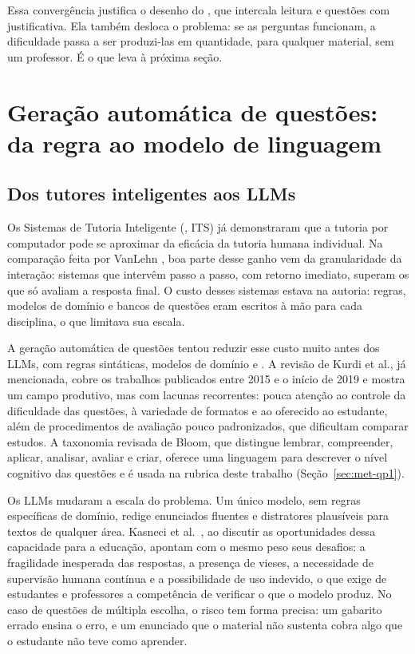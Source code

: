 Essa convergência justifica o desenho do \ferramenta, que intercala leitura e questões com justificativa. Ela também desloca o problema: se as perguntas funcionam, a dificuldade passa a ser produzi-las em quantidade, para qualquer material, sem um professor. É o que leva à próxima seção.

\section{\label{sec:geracao}Geração automática de questões: da regra ao modelo de linguagem}

\subsection{Dos tutores inteligentes aos LLMs}

Os Sistemas de Tutoria Inteligente (, ITS) já demonstraram que a tutoria por computador pode se aproximar da eficácia da tutoria humana individual. Na comparação feita por VanLehn \cite{Van11}, boa parte desse ganho vem da granularidade da interação: sistemas que intervêm passo a passo, com retorno imediato, superam os que só avaliam a resposta final. O custo desses sistemas estava na autoria: regras, modelos de domínio e bancos de questões eram escritos à mão para cada disciplina, o que limitava sua escala.

A geração automática de questões tentou reduzir esse custo muito antes dos LLMs, com regras sintáticas, modelos de domínio e . A revisão de Kurdi et al., já mencionada, cobre os trabalhos publicados entre 2015 e o início de 2019 e mostra um campo produtivo, mas com lacunas recorrentes: pouca atenção ao controle da dificuldade das questões, à variedade de formatos e ao  oferecido ao estudante, além de procedimentos de avaliação pouco padronizados, que dificultam comparar estudos. A taxonomia revisada de Bloom, que distingue lembrar, compreender, aplicar, analisar, avaliar e criar, oferece uma linguagem para descrever o nível cognitivo das questões e é usada na rubrica deste trabalho (Seção~\ref{sec:met-qp1}).

Os LLMs mudaram a escala do problema. Um único modelo, sem regras específicas de domínio, redige enunciados fluentes e distratores plausíveis para textos de qualquer área. Kasneci et al.\ \cite{KSS23}, ao discutir as oportunidades dessa capacidade para a educação, apontam com o mesmo peso seus desafios: a fragilidade inesperada das respostas, a presença de vieses, a necessidade de supervisão humana contínua e a possibilidade de uso indevido, o que exige de estudantes e professores a competência de verificar o que o modelo produz. No caso de questões de múltipla escolha, o risco tem forma precisa: um gabarito errado ensina o erro, e um enunciado que o material não sustenta cobra algo que o estudante não teve como aprender.


